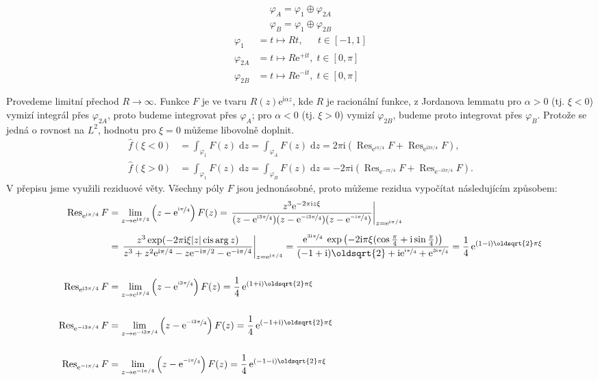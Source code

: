 \documentclass[10pt,a4paper]{article}
\def\ph{\phantom}
\newcommand{\const}[1]{\text{#1}}
\newcommand{\cis}{\operatorname{cis}}
\newcommand{\Res}{\operatorname{Res}}
\renewcommand{\d}[1]{\;\const{d}#1}
\newcommand{\e}[1]{\const{e}^{#1}}
\renewcommand{\i}{\const{i}}
\begin{document}
\begin{gather*}
    \varphi_A = \varphi_1 \oplus \varphi_{2A} \\
    \varphi_B = \varphi_1 \oplus \varphi_{2B}
\end{gather*}
\begin{align*}
    \varphi_{1\ph{A}} &= t \mapsto Rt, \; \ph{^+\i t} t \in [-1, 1] \\
    \varphi_{2A} &= t \mapsto R \e{+\i t}, \; t \in [0, \pi] \\
    \varphi_{2B} &= t \mapsto R \e{-\i t}, \; t \in [0, \pi]
\end{align*}

Provedeme limitní přechod $R\to\infty$. Funkce $F$ je ve tvaru $R(z)\e{\i\alpha z}$, kde $R$ je racionální funkce, z Jordanova lemmatu pro $\alpha>0$ (tj. $\xi<0$) vymizí integrál přes $\varphi_{2A}$, proto budeme integrovat přes $\varphi_A$; pro $\alpha<0$ (tj. $\xi>0$) vymizí $\varphi_{2B}$, budeme proto integrovat přes $\varphi_B$. Protože se jedná o rovnost na $L^2$, hodnotu pro $\xi=0$ můžeme libovolně doplnit.
\begin{align*}
    \hat{f}(\xi < 0)
    &= \int_{\varphi_1} F(z) \d{z}
    = \int_{\varphi_A} F(z) \d{z}
    = 2\pi\i \left( \Res_{\e{i\pi/4}} F + \Res_{\e{\i 3\pi/4}} F \right),
    \\[10pt]
    \hat{f}(\xi > 0)
    &= \int_{\varphi_1} F(z) \d{z}
    = \int_{\varphi_B} F(z) \d{z}
    = -2\pi\i \left( \Res_{\e{-i\pi/4}} F + \Res_{\e{-\i 3\pi/4}} F \right).
\end{align*}
V přepisu jsme využili reziduové věty. Všechny póly $F$ jsou jednonásobné, proto můžeme rezidua vypočítat následujícím způsobem:
\begin{align*}
    \Res_{\e{\i\pi/4}} F
    &= \lim_{z\to\e{\i\pi/4}} \left( z - \e{\nicefrac{\i\pi}{4}} \right) F(z)
    = \left. \frac{z^3 \e{-2\pi\i z\xi}}{(z-\e{\nicefrac{\i3\pi}{4}})(z-\e{\nicefrac{-\i3\pi}{4}})(z-\e{\nicefrac{-\i\pi}{4}})} \right|_{z=\e{\i\pi/4}}
    \\[5pt]
    &= \left. \frac{z^3 \exp(-2\pi\i\xi|z| \cis \arg z)}{z^3 + z^2 \e{\i\pi/4} - z\e{-\i\pi/2} - \e{-\i\pi/4}} \right|_{z=\e{\i\pi/4}}
    = \frac{
        \e{\nicefrac{3\i\pi}{4}} \; \exp \left(-2\i\pi\xi  (\cos \frac{\pi}{4} + \i \sin \frac{\pi}{4}) \right)
    }{
        (-1+\i)\oldsqrt{2} + \i\e{\nicefrac{\i\pi}{4}} + \e{\nicefrac{3\i\pi}{4}}
    }
    = \frac{1}{4} \, \e{(1-\i)\oldsqrt{2}\pi\xi}
    \\[15pt]
    \Res_{\e{\i3\pi/4}} F
    &= \lim_{z\to\e{\i\pi/4}} \left( z - \e{\nicefrac{\i3\pi}{4}} \right) F(z)
    = \frac{1}{4} \, \e{(1+\i)\oldsqrt{2}\pi\xi}
    \\[15pt]
    \Res_{\e{-\i3\pi/4}} F
    &= \lim_{z\to\e{-\i3\pi/4}} \left( z - \e{\nicefrac{-\i3\pi}{4}} \right) F(z)
    = \frac{1}{4} \, \e{(-1+\i)\oldsqrt{2}\pi\xi}
    \\[15pt]
    \Res_{\e{-\i\pi/4}} F
    &= \lim_{z\to\e{-\i\pi/4}} \left( z - \e{\nicefrac{-\i\pi}{4}} \right) F(z)
    = \frac{1}{4} \, \e{(-1-\i)\oldsqrt{2}\pi\xi}
\end{align*}
\end{document}
